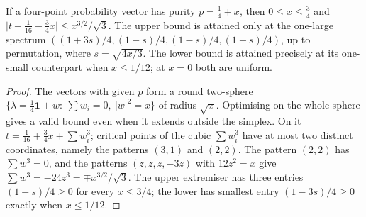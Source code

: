 \begin{lemma}\label{lem:fqe-third-moment}
If a four-point probability vector has purity $p=\frac14+x$, then $0\le x\le\frac34$ and
$\bigl|t-\frac1{16}-\frac34x\bigr|\le x^{3/2}/\sqrt3$.
The upper bound is attained only at the one-large spectrum
$((1+3s)/4,(1-s)/4,(1-s)/4,(1-s)/4)$, up to permutation,
where $s=\sqrt{4x/3}$. The lower bound is attained precisely at its
one-small counterpart when $x\le1/12$; at $x=0$ both are uniform.
\end{lemma}
\begin{proof}
The vectors with given $p$ form a round two-sphere $\{\lambda=\frac14\mathbf1+w:\ \sum w_i=0,\ |w|^2=x\}$
of radius $\sqrt x$. Optimising on the whole sphere gives a valid bound
even when it extends outside the simplex. On it $t=\frac1{16}+\frac34x+\sum w_i^3$; critical points of the cubic
$\sum w_i^3$ have at most two distinct coordinates, namely the patterns $(3,1)$ and $(2,2)$.
The pattern $(2,2)$ has $\sum w^3=0$, and the patterns $(z,z,z,-3z)$ with $12z^2=x$ give
$\sum w^3=-24z^3=\mp x^{3/2}/\sqrt3$.
The upper extremiser has three entries $(1-s)/4\ge0$ for every $x\le3/4$;
the lower has smallest entry $(1-3s)/4\ge0$ exactly when $x\le1/12$.
\end{proof}


